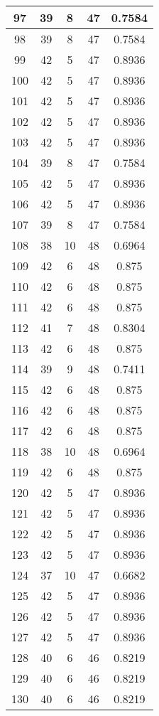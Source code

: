 \documentclass[letterpaper, 12pt]{article}
\begin{document}
\begin{longtable}{|c|c|c|c|c|}
\hline
97 & 39 & 8 & 47 & 0.7584 \\
\hline
98 & 39 & 8 & 47 & 0.7584 \\
\hline
99 & 42 & 5 & 47 & 0.8936 \\
\hline
100 & 42 & 5 & 47 & 0.8936 \\
\hline
101 & 42 & 5 & 47 & 0.8936 \\
\hline
102 & 42 & 5 & 47 & 0.8936 \\
\hline
103 & 42 & 5 & 47 & 0.8936 \\
\hline
104 & 39 & 8 & 47 & 0.7584 \\
\hline
105 & 42 & 5 & 47 & 0.8936 \\
\hline
106 & 42 & 5 & 47 & 0.8936 \\
\hline
107 & 39 & 8 & 47 & 0.7584 \\
\hline
108 & 38 & 10 & 48 & 0.6964 \\
\hline
109 & 42 & 6 & 48 & 0.875 \\
\hline
110 & 42 & 6 & 48 & 0.875 \\
\hline
111 & 42 & 6 & 48 & 0.875 \\
\hline
112 & 41 & 7 & 48 & 0.8304 \\
\hline
113 & 42 & 6 & 48 & 0.875 \\
\hline
114 & 39 & 9 & 48 & 0.7411 \\
\hline
115 & 42 & 6 & 48 & 0.875 \\
\hline
116 & 42 & 6 & 48 & 0.875 \\
\hline
117 & 42 & 6 & 48 & 0.875 \\
\hline
118 & 38 & 10 & 48 & 0.6964 \\
\hline
119 & 42 & 6 & 48 & 0.875 \\
\hline
120 & 42 & 5 & 47 & 0.8936 \\
\hline
121 & 42 & 5 & 47 & 0.8936 \\
\hline
122 & 42 & 5 & 47 & 0.8936 \\
\hline
123 & 42 & 5 & 47 & 0.8936 \\
\hline
124 & 37 & 10 & 47 & 0.6682 \\
\hline
125 & 42 & 5 & 47 & 0.8936 \\
\hline
126 & 42 & 5 & 47 & 0.8936 \\
\hline
127 & 42 & 5 & 47 & 0.8936 \\
\hline
128 & 40 & 6 & 46 & 0.8219 \\
\hline
129 & 40 & 6 & 46 & 0.8219 \\
\hline
130 & 40 & 6 & 46 & 0.8219 \\

\end{longtable}
\end{document}
